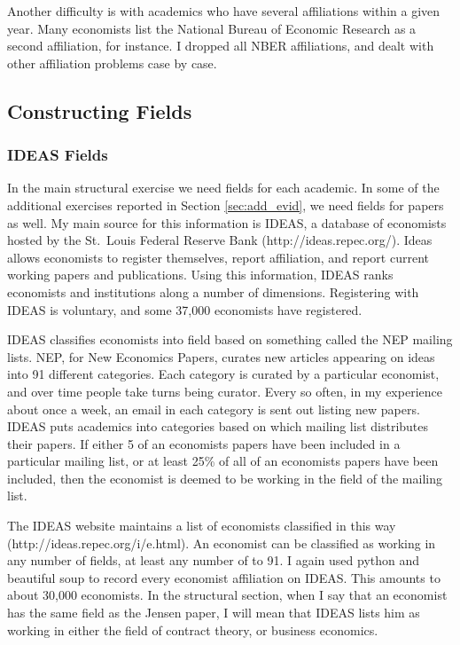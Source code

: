 Another difficulty is with academics who have several affiliations within
a given year. Many economists list the National Bureau of Economic
Research as a second affiliation, for instance. I dropped all NBER
affiliations, and dealt with other affiliation problems case by case.

\subsection{Constructing Fields}

\subsubsection{IDEAS Fields}

In the main structural exercise we need fields for each academic.
In some of the additional exercises reported in Section \ref{sec:add_evid}, we need
fields for papers as well. My main source for this information is IDEAS,
a database of economists hosted by the St.~Louis Federal Reserve Bank
(http://ideas.repec.org/). Ideas allows economists to register
themselves, report affiliation, and report current working papers and
publications. Using this information, IDEAS ranks economists and
institutions along a number of dimensions. Registering with IDEAS is
voluntary, and some 37,000 economists have registered.

IDEAS classifies economists into field based on something called the NEP
mailing lists. NEP, for New Economics Papers, curates new articles
appearing on ideas into 91 different categories. Each category is
curated by a particular economist, and over time people take turns being
curator. Every so often, in my experience about once a week, an email in
each category is sent out listing new papers. IDEAS puts academics into
categories based on which mailing list distributes their papers. If
either 5 of an economists papers have been included in a particular
mailing list, or at least 25\% of all of an economists papers have been
included, then the economist is deemed to be working in the field of the
mailing list.

The IDEAS website maintains a list of economists classified in this way
(http://ideas.repec.org/i/e.html). An economist can be classified as
working in any number of fields, at least any number of to 91. I again
used python and beautiful soup to record every economist affiliation on
IDEAS. This amounts to about 30,000 economists. In the structural
section, when I say that an economist has the same field as the Jensen
paper, I will mean that IDEAS lists him as working in either the field
of contract theory, or business economics.

